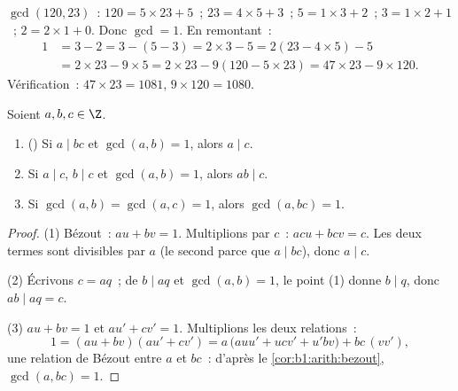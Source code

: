 \begin{example}\label{ex:b1:arith:euclid}
$\gcd(120, 23)$~: $120 = 5 \times 23 + 5$~; $23 = 4 \times 5 + 3$~; $5 =
1\times 3 + 2$~; $3 = 1 \times 2 + 1$~; $2 = 2 \times 1 + 0$. Donc
$\gcd = 1$. En remontant~:
\begin{align*}
1 &= 3 - 2 = 3 - (5 - 3) = 2\times 3 - 5 = 2(23 - 4\times 5) - 5 \\
&= 2 \times 23 - 9 \times 5 = 2\times 23 - 9(120 - 5\times 23)
= 47 \times 23 - 9 \times 120 .
\end{align*}
Vérification~: $47 \times 23 = 1081$, $9 \times 120 = 1080$.
\end{example}

\begin{theorem}\label{thm:b1:arith:gauss}
Soient $a, b, c \in \Z$.
\begin{enumerate}
  \item () Si $a \mid bc$ et
        $\gcd(a, b) = 1$, alors $a \mid c$.
  \item Si $a \mid c$, $b \mid c$ et $\gcd(a,b) = 1$, alors $ab \mid
        c$.
  \item Si $\gcd(a, b) = \gcd(a, c) = 1$, alors $\gcd(a, bc) = 1$.
\end{enumerate}
\end{theorem}

\begin{proof}
(1) Bézout~: $au + bv = 1$. Multiplions par $c$~: $acu + bcv = c$. Les deux
termes sont divisibles par $a$ (le second parce que $a \mid bc$), donc $a
\mid c$.

(2) Écrivons $c = aq$~; de $b \mid aq$ et $\gcd(a, b) = 1$, le point (1)
donne $b \mid q$, donc $ab \mid aq = c$.

(3) $au + bv = 1$ et $au' + cv' = 1$. Multiplions les deux
relations~:
\[
1 = (au + bv)(au' + cv')
= a\,\bigl(auu' + ucv' + u'bv\bigr) + bc\,(vv') ,
\]
une relation de Bézout entre $a$ et $bc$~: d'après le
\cref{cor:b1:arith:bezout}, $\gcd(a, bc) = 1$.
\end{proof}

